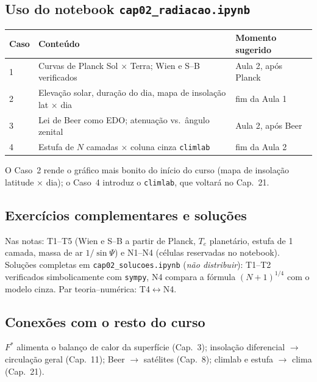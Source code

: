 \subsection*{Uso do notebook \texttt{cap02\_radiacao.ipynb}}

\begin{center}
\begin{tabular}{lll}
\hline
Caso & Conteúdo & Momento sugerido \\
\hline
1 & Curvas de Planck Sol × Terra; Wien e S--B verificados & Aula 2, após Planck \\
2 & Elevação solar, duração do dia, mapa de insolação lat × dia & fim da Aula 1 \\
3 & Lei de Beer como EDO; atenuação vs.\ ângulo zenital & Aula 2, após Beer \\
4 & Estufa de $N$ camadas × coluna cinza \texttt{climlab} & fim da Aula 2 \\
\hline
\end{tabular}
\end{center}

O Caso~2 rende o gráfico mais bonito do início do curso (mapa de insolação
latitude × dia); o Caso~4 introduz o \texttt{climlab}, que voltará no
Cap.~21.

\subsection*{Exercícios complementares e soluções}

Nas notas: T1--T5 (Wien e S--B a partir de Planck, $T_e$ planetário, estufa
de 1 camada, massa de ar $1/\sin\Psi$) e N1--N4 (células reservadas no
notebook). Soluções completas em \texttt{cap02\_solucoes.ipynb}
(\emph{não distribuir}): T1--T2 verificados simbolicamente com
\texttt{sympy}, N4 compara a fórmula $(N{+}1)^{1/4}$ com o modelo cinza.
Par teoria--numérica: T4$\leftrightarrow$N4.

\subsection*{Conexões com o resto do curso}

$F^*$ alimenta o balanço de calor da superfície (Cap.~3); insolação
diferencial $\to$ circulação geral (Cap.~11); Beer $\to$ satélites
(Cap.~8); climlab e estufa $\to$ clima (Cap.~21).
